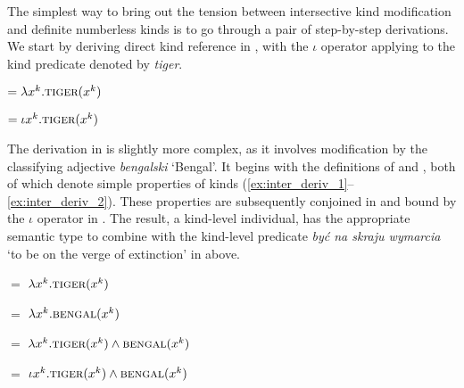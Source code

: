 \documentclass[output=paper]{langscibook}
\begin{document}
The simplest way to bring out the tension between intersective kind modification and definite numberless kinds is to go through a pair of step-by-step derivations. We start by deriving direct kind reference in , with the $\iota$ operator applying to the kind predicate denoted by \textit{tiger}.

\ea \label{ex:def_deriv}

\ea {} $= \lambda x^k.\textsc{tiger}(x^k)$
\label{ex:def_deriv_1}

\ex {} $= \iota x^k.\textsc{tiger}(x^k)$
\label{ex:def_deriv_2}
\z \z

\noindent
The derivation in  is slightly more complex, as it involves modification by the classifying adjective \textit{bengalski} `Bengal'. It begins with the definitions of  and , both of which denote simple properties of kinds (\ref{ex:inter_deriv_1}--\ref{ex:inter_deriv_2}). These properties are subsequently conjoined in  and bound by the $\iota$ operator in . The result, a kind-level individual, has the appropriate semantic type to combine with the kind-level predicate \textit{być na skraju wymarcia} `to be on the verge of extinction' in  above.

\ea \label{ex:inter_deriv}

\ea {} $=$  $\lambda x^k.\textsc{tiger}(x^k)$
\label{ex:inter_deriv_1}

\ex {} $=$  $\lambda x^k.\textsc{bengal}(x^k)$
\label{ex:inter_deriv_2}

\ex {} $=$ $\lambda x^k.\textsc{tiger}(x^k) \wedge \textsc{bengal}(x^k)$
\label{ex:inter_deriv_3}

\ex {} $=$ $\iota x^k.\textsc{tiger}(x^k) \wedge \textsc{bengal}(x^k)$
\label{ex:inter_deriv_4}
\z \z
\end{document}
